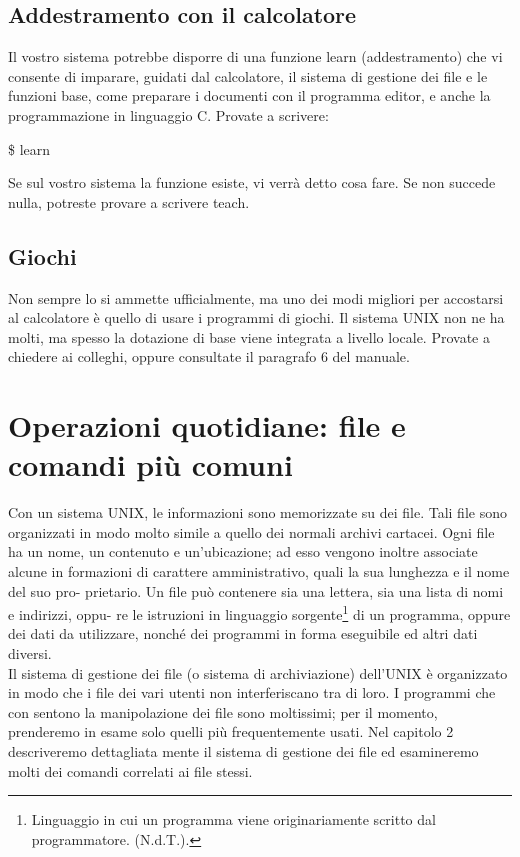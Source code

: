 \subsection{Addestramento con il calcolatore}
Il vostro sistema potrebbe disporre di una funzione learn (addestramento) che vi consente
di imparare, guidati dal calcolatore, il sistema di gestione dei file e le funzioni
base, come preparare i documenti con il programma editor, e anche la programmazione 
in linguaggio C. Provate a scrivere:
\begin{multicols}{2}
	\$ learn \\
\end{multicols}
Se sul vostro sistema la funzione esiste, vi verrà detto cosa fare. Se non succede nulla,
potreste provare a scrivere teach.
\subsection{Giochi}
Non sempre lo si ammette ufficialmente, ma uno dei modi migliori per accostarsi al
calcolatore è quello di usare i programmi di giochi. Il sistema UNIX non ne ha molti,
ma spesso la dotazione di base viene integrata a livello locale. Provate a chiedere ai
colleghi, oppure consultate il paragrafo 6 del manuale.
\section{Operazioni quotidiane: file e comandi più comuni}
Con un sistema UNIX, le informazioni sono memorizzate su dei file. Tali file sono
organizzati in modo molto simile a quello dei normali archivi cartacei. Ogni file ha
un nome, un contenuto e un'ubicazione; ad esso vengono inoltre associate alcune in
formazioni di carattere amministrativo, quali la sua lunghezza e il nome del suo pro-
prietario. Un file può contenere sia una lettera, sia una lista di nomi e indirizzi, oppu-
re le istruzioni in linguaggio sorgente\footnote{Linguaggio in cui un programma viene
	originariamente scritto dal programmatore. (N.d.T.).} di un programma, oppure dei 
dati da utilizzare, nonché dei programmi in forma eseguibile ed altri dati diversi.\\
Il sistema di gestione dei file (o sistema di archiviazione) dell'UNIX è organizzato
in modo che i file dei vari utenti non interferiscano tra di loro. I programmi che con
sentono la manipolazione dei file sono moltissimi; per il momento, prenderemo in
esame solo quelli più frequentemente usati. Nel capitolo 2 descriveremo dettagliata
mente il sistema di gestione dei file ed esamineremo molti dei comandi correlati ai file
stessi.
